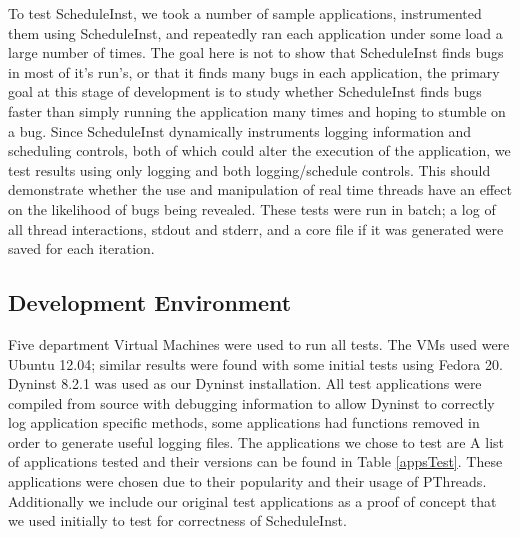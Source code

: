 \documentclass[10pt,]{article} %
\begin{document}
To test ScheduleInst, we took a number of sample applications, instrumented them using ScheduleInst, and repeatedly ran each application under some load a large number of times.  The goal here is not to show that ScheduleInst finds bugs in most of it’s run’s, or that it finds many bugs in each application, the primary goal at this stage of development is to study whether ScheduleInst finds bugs faster than simply running the application many times and hoping to stumble on a bug.  Since ScheduleInst dynamically instruments logging information and scheduling controls, both of which could alter the execution of the application, we test results using only logging and both logging/schedule controls.  This should demonstrate whether the use and manipulation of real time threads have an effect on the likelihood of bugs being revealed.  These tests were run in batch; a log of all thread interactions, stdout and stderr, and a core file if it was generated were saved for each iteration.       



\subsection{Development Environment}

Five department Virtual Machines were used to run all tests.  The VMs used were Ubuntu 12.04; similar results were found with some initial tests using Fedora 20. Dyninst 8.2.1 was used as our Dyninst installation.  All test applications were compiled from source with debugging information to allow Dyninst to correctly log application specific methods, some applications had functions removed in order to generate useful logging files. The applications we chose to test are  A list of applications tested and their versions can be found in Table \ref{appsTest}.  These applications were chosen due to their popularity and their usage of PThreads.  Additionally we include our original test applications as a proof of concept that we used initially to test for correctness of ScheduleInst.
\end{document}
